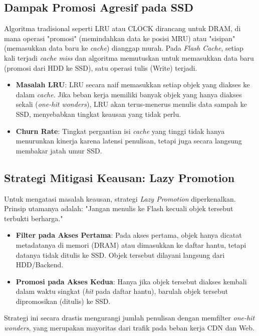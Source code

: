 \subsection{Dampak Promosi Agresif pada SSD}
Algoritma tradisional seperti LRU atau CLOCK dirancang untuk DRAM,
di mana operasi "promosi" (memindahkan data ke posisi MRU) atau
"sisipan" (memasukkan data baru ke \textit{cache}) dianggap murah.
Pada \textit{Flash Cache}, setiap kali terjadi \textit{cache miss}
dan algoritma memutuskan untuk memasukkan data baru (promosi dari
HDD ke SSD), satu operasi tulis (Write) terjadi.
\begin{itemize}
  \item \textbf{Masalah LRU}: LRU secara naif memasukkan setiap
    objek yang diakses ke dalam \textit{cache}. Jika beban kerja memiliki
    banyak objek yang hanya diakses sekali (\textit{one-hit wonders}),
    LRU akan terus-menerus menulis data sampah ke SSD, menyebabkan
    tingkat keausan yang tidak perlu.
  \item \textbf{Churn Rate}: Tingkat pergantian isi \textit{cache} yang
    tinggi tidak hanya menurunkan kinerja karena latensi penulisan,
    tetapi juga secara langsung membakar jatah umur SSD.
\end{itemize}

\subsection{Strategi Mitigasi Keausan: Lazy Promotion}
Untuk mengatasi masalah keausan, strategi \textit{Lazy Promotion}
diperkenalkan. Prinsip utamanya adalah: "Jangan menulis ke Flash
kecuali objek tersebut terbukti berharga."
\begin{itemize}
  \item \textbf{Filter pada Akses Pertama}: Pada akses pertama,
    objek hanya dicatat metadatanya di memori (DRAM) atau dimasukkan
    ke daftar hantu, tetapi datanya tidak ditulis ke SSD. Objek
    tersebut dilayani langsung dari HDD/Backend.
  \item \textbf{Promosi pada Akses Kedua}: Hanya jika objek tersebut
    diakses kembali dalam waktu singkat (\textit{hit} pada daftar hantu),
    barulah objek tersebut dipromosikan (ditulis) ke SSD.
\end{itemize}
Strategi ini secara drastis mengurangi jumlah penulisan dengan
memfilter \textit{one-hit wonders}, yang merupakan mayoritas dari
trafik pada beban kerja CDN dan Web.

